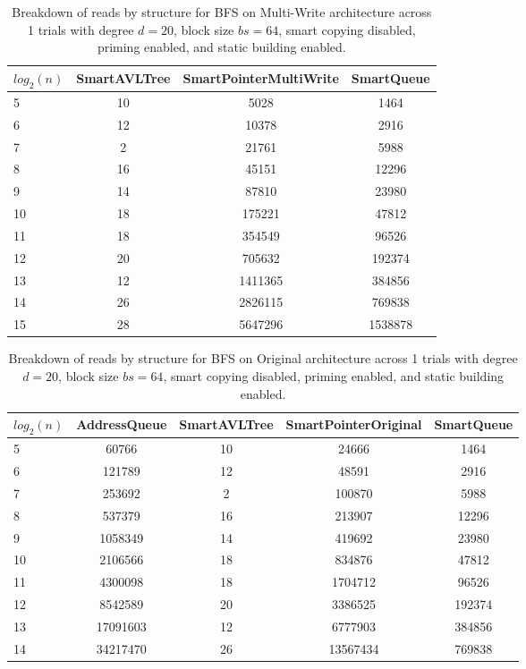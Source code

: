 \begin{table}[]
\centering
\begin{tabular}{|l|c|c|c|}
$log_2(n)$ & SmartAVLTree & SmartPointerMultiWrite & SmartQueue \\ \hline
5 & 10 & 5028 & 1464 \\ \hline
6 & 12 & 10378 & 2916 \\ \hline
7 & 2 & 21761 & 5988 \\ \hline
8 & 16 & 45151 & 12296 \\ \hline
9 & 14 & 87810 & 23980 \\ \hline
10 & 18 & 175221 & 47812 \\ \hline
11 & 18 & 354549 & 96526 \\ \hline
12 & 20 & 705632 & 192374 \\ \hline
13 & 12 & 1411365 & 384856 \\ \hline
14 & 26 & 2826115 & 769838 \\ \hline
15 & 28 & 5647296 & 1538878 \\ \hline
\end{tabular}
\caption{Breakdown of reads by structure for BFS on Multi-Write architecture across 1 trials with degree $d=20$, block size $bs=64$, smart copying disabled, priming enabled, and static building enabled.}
    \label{tab:reads_by_structure_bfs_d20_bs64_trials1_copiesfalse_primetrue_staticinsertiontrue_ptmultiwrite_movetrue}
\end{table}

\begin{table}[]
\centering
\begin{tabular}{|l|c|c|c|c|}
$log_2(n)$ & AddressQueue & SmartAVLTree & SmartPointerOriginal & SmartQueue \\ \hline
5 & 60766 & 10 & 24666 & 1464 \\ \hline
6 & 121789 & 12 & 48591 & 2916 \\ \hline
7 & 253692 & 2 & 100870 & 5988 \\ \hline
8 & 537379 & 16 & 213907 & 12296 \\ \hline
9 & 1058349 & 14 & 419692 & 23980 \\ \hline
10 & 2106566 & 18 & 834876 & 47812 \\ \hline
11 & 4300098 & 18 & 1704712 & 96526 \\ \hline
12 & 8542589 & 20 & 3386525 & 192374 \\ \hline
13 & 17091603 & 12 & 6777903 & 384856 \\ \hline
14 & 34217470 & 26 & 13567434 & 769838 \\ \hline
\end{tabular}
\caption{Breakdown of reads by structure for BFS on Original architecture across 1 trials with degree $d=20$, block size $bs=64$, smart copying disabled, priming enabled, and static building enabled.}
    \label{tab:reads_by_structure_bfs_d20_bs64_trials1_copiesfalse_primetrue_staticinsertiontrue_ptoriginal_movefalse}
\end{table}

